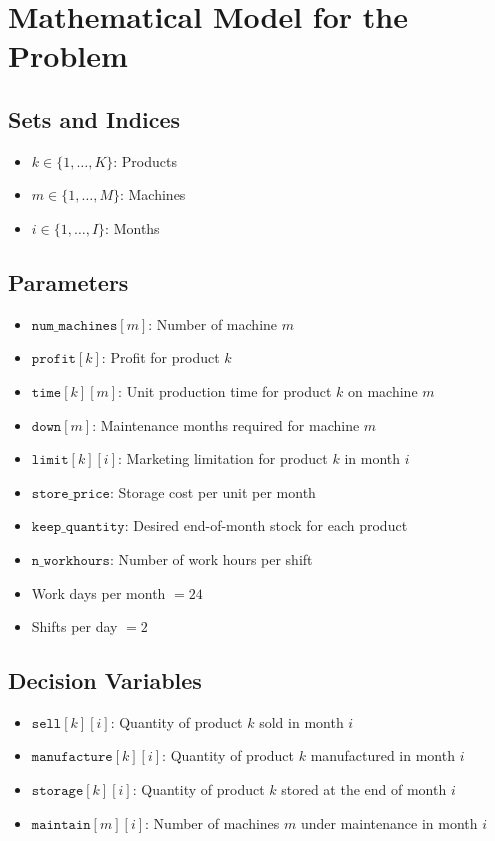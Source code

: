 \documentclass{article}
\begin{document}
\section*{Mathematical Model for the Problem}

\subsection*{Sets and Indices}
\begin{itemize}
    \item \( k \in \{1, \ldots, K\} \): Products
    \item \( m \in \{1, \ldots, M\} \): Machines
    \item \( i \in \{1, \ldots, I\} \): Months
\end{itemize}

\subsection*{Parameters}
\begin{itemize}
    \item \( \texttt{num\_machines}[m] \): Number of machine \( m \)
    \item \( \texttt{profit}[k] \): Profit for product \( k \) 
    \item \( \texttt{time}[k][m] \): Unit production time for product \( k \) on machine \( m \)
    \item \( \texttt{down}[m] \): Maintenance months required for machine \( m \)
    \item \( \texttt{limit}[k][i] \): Marketing limitation for product \( k \) in month \( i \)
    \item \( \texttt{store\_price} \): Storage cost per unit per month
    \item \( \texttt{keep\_quantity} \): Desired end-of-month stock for each product
    \item \( \texttt{n\_workhours} \): Number of work hours per shift
    \item Work days per month \( = 24 \)
    \item Shifts per day \( = 2 \)
\end{itemize}

\subsection*{Decision Variables}
\begin{itemize}
    \item \( \texttt{sell}[k][i] \): Quantity of product \( k \) sold in month \( i \)
    \item \( \texttt{manufacture}[k][i] \): Quantity of product \( k \) manufactured in month \( i \)
    \item \( \texttt{storage}[k][i] \): Quantity of product \( k \) stored at the end of month \( i \)
    \item \( \texttt{maintain}[m][i] \): Number of machines \( m \) under maintenance in month \( i \)
\end{itemize}
\end{document}
